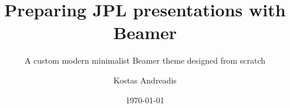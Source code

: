 \documentclass{beamer}
\title{Preparing JPL presentations with Beamer}
\subtitle{A custom modern minimalist Beamer theme designed from scratch}
\author{Kostas Andreadis}
\date{\today}
\begin{document}
    \frame{\titlepage}
\end{document}
